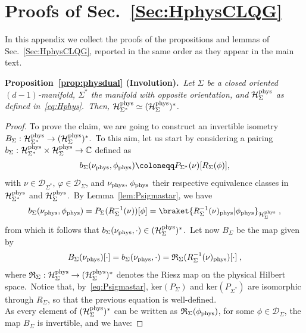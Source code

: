 \documentclass[11pt]{article}
\newcommand{\C}{\mathbb{C}}
\newcommand{\Hil}{\mathcal{H}}
\newcommand{\Hphys}{\mathcal{H}_{\Sigma}^{\rm phys}}
\theoremstyle{definition}
\numberwithin{equation}{section}
\begin{document}
\section{Proofs of Sec.~\ref{Sec:HphysCLQG}}\label{App:Proofs3}

In this appendix we collect the proofs of the propositions and lemmas of Sec.~\ref{Sec:HphysCLQG}, reported in the same order as they appear in the main text.

\noindent
\textbf{Proposition~\ref{prop:physdual} (Involution).}~\emph{Let $\Sigma$ be a closed oriented $(d-1)$-manifold, $\Sigma^*$ the manifold with opposite orientation, and $\Hphys$ as defined in~\eqref{eq:Hphys}.~Then, $\Hil^{\rm phys}_{\Sigma^*}\simeq(\Hphys)^*$.}
\begin{proof}
To prove the claim, we are going to construct an invertible isometry $B_{\Sigma}:\Hil^{\rm phys}_{\Sigma^*}\to(\Hphys)^*$.~To this aim, let us start by considering a pairing $b_{\Sigma}:\Hil^{\rm phys}_{\Sigma^*}\times \Hphys \to \C$ defined as
\begin{equation}
    b_{\Sigma}(\nu_{\rm phys},\phi_{\rm phys})\coloneqq P_{\Sigma^*}(\nu)[R_{\Sigma}(\phi)],
\end{equation}
with $\nu\in\mathcal{D}_{\Sigma^*},\,\varphi\in\mathcal{D}_{\Sigma}$, and $\nu_{\rm phys},\,\phi_{\rm phys}$ their respective equivalence classes in $\Hil^{\rm phys}_{\Sigma^*}$ and $ \Hphys$.~By Lemma~\ref{lem:Psigmastar}, we have
\begin{equation}
    b_{\Sigma}(\nu_{\rm phys},\phi_{\rm phys})=P_{\Sigma}(R_{\Sigma}^{-1}(\nu))[\phi]=\braket{R_{\Sigma}^{-1}(\nu)_{\rm phys}|\phi_{\rm phys}}_{\Hphys}\;,
\end{equation}
from which it follows that $b_{\Sigma}(\nu_{\rm phys},\cdot)\in(\Hphys)^*$.~Let now $B_{\Sigma}$ be the map given by
\begin{equation}
    B_{\Sigma}(\nu_{\rm phys})[\cdot]=b_{\Sigma}(\nu_{\rm phys},\cdot)=\mathfrak{R}_{\Sigma}(R_{\Sigma}^{-1}(\nu)_{\rm phys})[\cdot]\;,
\end{equation}
where $\mathfrak{R}_{\Sigma}:\Hphys\to(\Hphys)^*$ denotes the Riesz map on the physical Hilbert space.~Notice that, by~\eqref{eq:Psigmastar}, $\mathrm{ker}(P_\Sigma)$ and $\mathrm{ker}(P_{\Sigma^*})$ are isomorphic through $R_{\Sigma}$, so that the previous equation is well-defined.\\
As every element of $(\Hphys)^*$ can be written as $\mathfrak{R}_{\Sigma}(\phi_{\rm phys})$, for some $\phi\in\mathcal{D}_{\Sigma}$, the map $B_{\Sigma}$ is invertible, and we have:

\end{proof}
\end{document}
